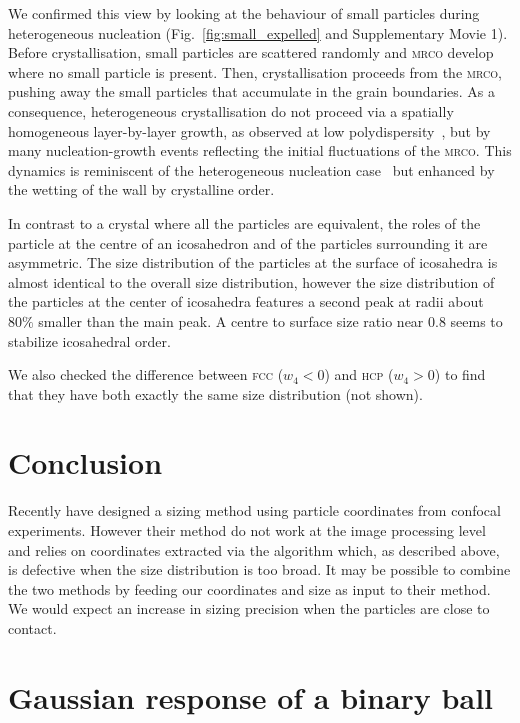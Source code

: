 \documentclass[8.5pt,twoside,twocolumn]{article}
\begin{document}
We confirmed this view by looking at the behaviour of small particles during heterogeneous nucleation (Fig.~\ref{fig:small_expelled} and Supplementary Movie 1). Before crystallisation, small particles are scattered randomly and \textsc{mrco} develop where no small particle is present. Then, crystallisation proceeds from the \textsc{mrco}, pushing away the small particles that accumulate in the grain boundaries. As a consequence, heterogeneous crystallisation do not proceed via a spatially homogeneous layer-by-layer growth, as observed at low polydispersity~\cite{Sandomirski2011}, but by many nucleation-growth events reflecting the initial fluctuations of the \textsc{mrco}. This dynamics is reminiscent of the heterogeneous nucleation case~\cite{Kawasaki2010c} but enhanced by the wetting of the wall by crystalline order.

In contrast to a crystal where all the particles are equivalent, the roles of the particle at the centre of an icosahedron and of the particles surrounding it are asymmetric. The size distribution of the particles at the surface of icosahedra is almost identical to the overall size distribution, however the size distribution of the particles at the center of icosahedra features a second peak at radii about $80\%$ smaller than the main peak. A centre to surface size ratio near $0.8$ seems to stabilize icosahedral order.

We also checked the difference between \textsc{fcc} ($w_4<0$) and \textsc{hcp} ($w_4>0$) to find that they have both exactly the same size distribution (not shown).

\section{Conclusion}
Recently \citet{Kurita2011,Kurita2011b} have designed a sizing method using particle coordinates from confocal experiments. However their method do not work at the image processing level and relies on coordinates extracted via the \citet{Crocker1996} algorithm which, as described above, is defective when the size distribution is too broad. It may be possible to combine the two methods by feeding our coordinates and size as input to their method. We would expect an increase in sizing precision when the particles are close to contact.

\appendix

\section{Gaussian response of a binary ball}
\label{sec:gaussian_vs_ball}
\end{document}
